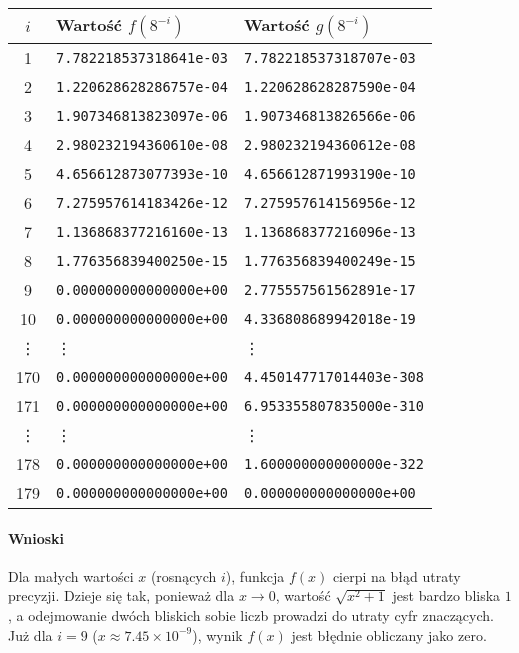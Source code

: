 \documentclass[a4paper,12pt]{article}
\begin{document}
\begin{center}
\begin{tabular}{@{}c l l@{}}
\hline
$i$ & Wartość $f(8^{-i})$ & Wartość $g(8^{-i})$ \\
\hline
1 & \texttt{7.782218537318641e-03} & \texttt{7.782218537318707e-03} \\
2 & \texttt{1.220628628286757e-04} & \texttt{1.220628628287590e-04} \\
3 & \texttt{1.907346813823097e-06} & \texttt{1.907346813826566e-06} \\
4 & \texttt{2.980232194360610e-08} & \texttt{2.980232194360612e-08} \\
5 & \texttt{4.656612873077393e-10} & \texttt{4.656612871993190e-10} \\
6 & \texttt{7.275957614183426e-12} & \texttt{7.275957614156956e-12} \\
7 & \texttt{1.136868377216160e-13} & \texttt{1.136868377216096e-13} \\
8 & \texttt{1.776356839400250e-15} & \texttt{1.776356839400249e-15} \\
9 & \texttt{0.000000000000000e+00} & \texttt{2.775557561562891e-17} \\
10 & \texttt{0.000000000000000e+00} & \texttt{4.336808689942018e-19} \\
\vdots & \vdots & \vdots \\
170 & \texttt{0.000000000000000e+00} & \texttt{4.450147717014403e-308} \\
171 & \texttt{0.000000000000000e+00} & \texttt{6.953355807835000e-310} \\
\vdots & \vdots & \vdots \\
178 & \texttt{0.000000000000000e+00} & \texttt{1.600000000000000e-322} \\
179 & \texttt{0.000000000000000e+00} & \texttt{0.000000000000000e+00} \\
\hline
\end{tabular}
\end{center}

\paragraph{Wnioski}
Dla małych wartości $x$ (rosnących $i$), funkcja $f(x)$ cierpi na błąd utraty precyzji. Dzieje się tak, ponieważ dla $x \to 0$, wartość $\sqrt{x^2+1}$ jest bardzo bliska $1$, a odejmowanie dwóch bliskich sobie liczb prowadzi do utraty cyfr znaczących. Już dla $i=9$ ($x \approx 7.45 \times 10^{-9}$), wynik $f(x)$ jest błędnie obliczany jako zero.
\end{document}
